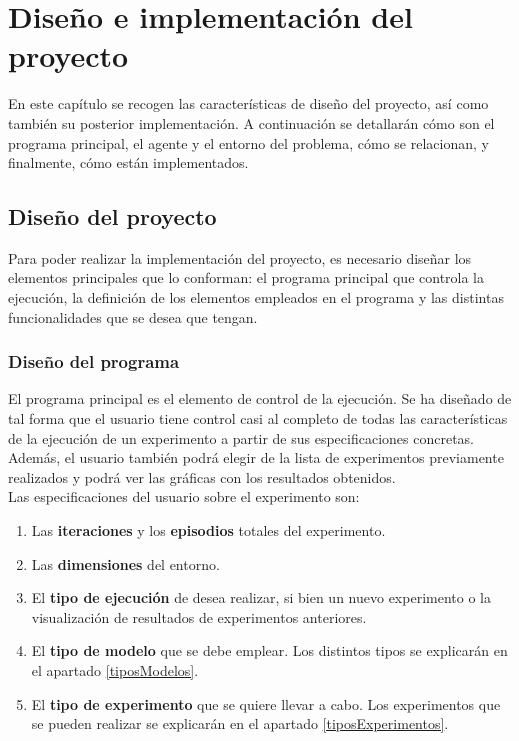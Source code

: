 
\chapter{Diseño e implementación del proyecto} \label{diseño_implementacion}

En este capítulo se recogen las características de diseño del proyecto, así como también su posterior implementación. A continuación se detallarán cómo son el programa principal, el agente y el entorno del problema, cómo se relacionan, y finalmente, cómo están implementados. 

\section{Diseño del proyecto}

Para poder realizar la implementación del proyecto, es necesario diseñar los elementos principales que lo conforman: el programa principal que controla la ejecución, la definición de los elementos empleados en el programa y las distintas funcionalidades que se desea que tengan.  

\subsection{Diseño del programa}

El programa principal es el elemento de control de la ejecución. Se ha diseñado de tal forma que el usuario tiene control casi al completo de todas las características de la ejecución de un experimento a partir de sus especificaciones concretas. Además, el usuario también podrá elegir de la lista de experimentos previamente realizados y podrá ver las gráficas con los resultados obtenidos. \\

Las especificaciones del usuario sobre el experimento son:
\begin{enumerate}
    \item Las \textbf{iteraciones} y los \textbf{episodios} totales del experimento.
    \item Las \textbf{dimensiones} del entorno.
    \item El \textbf{tipo de ejecución} de desea realizar, si bien un nuevo experimento o la visualización de  resultados de experimentos anteriores. 
    \item El \textbf{tipo de modelo} que se debe emplear. Los distintos tipos se explicarán en el apartado \ref{tiposModelos}.
    \item El \textbf{tipo de experimento} que se quiere llevar a cabo. Los experimentos que se pueden realizar se explicarán en el apartado \ref{tiposExperimentos}.
\end{enumerate}

